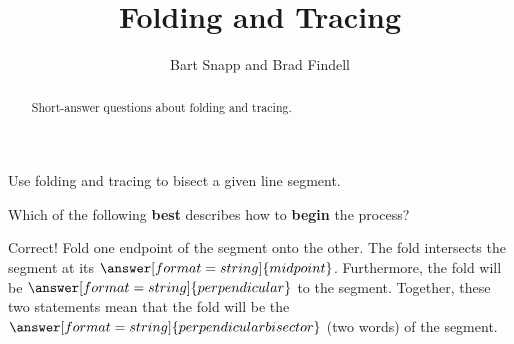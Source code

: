 \documentclass[nooutcomes]{ximera}
\title{Folding and Tracing}
\author{Bart Snapp and Brad Findell}
\begin{document}
\begin{abstract}
Short-answer questions about folding and tracing. 
\end{abstract}
\maketitle

%


\begin{problem}
Use folding and tracing to bisect a given line segment. 
\begin{image}
\end{image}
Which of the following \textbf{best} describes how to \textbf{begin} the process?  
\begin{multipleChoice}
\end{multipleChoice}
\begin{problem}
Correct!  Fold one endpoint of the segment onto the other.  The fold intersects the segment at its $\answer[format=string]{midpoint}$.  
Furthermore, the fold will be $\answer[format=string]{perpendicular}$ to the segment.  Together, these two statements mean that the fold 
will be the $\answer[format=string]{perpendicular bisector}$ (two words) of the segment.
\end{problem}
\end{problem}
\end{document}
